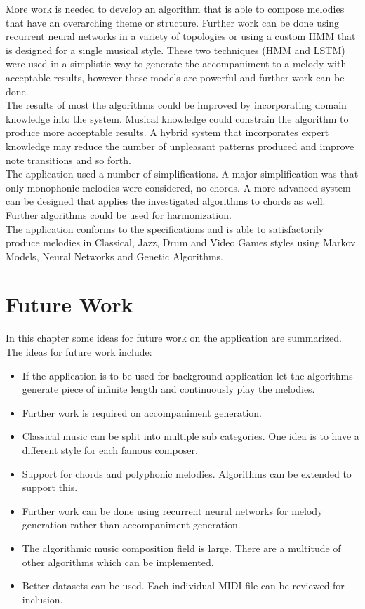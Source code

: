 More work is needed to develop an algorithm that is able to compose melodies that have an overarching theme or structure.  Further work can be done using recurrent neural networks in a variety of topologies or using a custom \ac{HMM} that is designed for a single musical style. 
These two techniques (\ac{HMM} and \ac{LSTM}) were used in a simplistic way to generate the accompaniment to a melody with acceptable results, however these models are powerful and further work can be done.
\\

The results of most the algorithms could be improved by incorporating domain knowledge into the system. Musical knowledge could constrain the algorithm to produce more acceptable results. A hybrid system that incorporates expert knowledge may reduce the number of unpleasant patterns produced and improve note transitions and so forth.
\\

The application used a number of simplifications. A major simplification was that only monophonic melodies were considered, no chords. A more advanced system can be designed that applies the investigated algorithms to chords as well. Further algorithms could be used for harmonization.
\\

The application conforms to the specifications and is able to satisfactorily produce melodies in Classical, Jazz, Drum and Video Games styles using Markov Models, Neural Networks and Genetic Algorithms.

\chapter{Future Work}

In this chapter some ideas for future work on the application are summarized.
The ideas for future work include:

\begin{itemize}
\item If the application is to be used for background application let the algorithms generate piece of infinite length and continuously play the melodies.
\item Further work is required on accompaniment generation.
\item Classical music can be split into multiple sub categories. One idea is to have a different style for each famous composer.
\item Support for chords and polyphonic melodies. Algorithms can be extended to support this.
\item Further work can be done using recurrent neural networks for melody generation rather than accompaniment generation.
\item The algorithmic music composition field is large. There are a multitude of other algorithms which can be implemented.
\item Better datasets can be used. Each individual \ac{MIDI} file can be reviewed for inclusion.
\end{itemize}